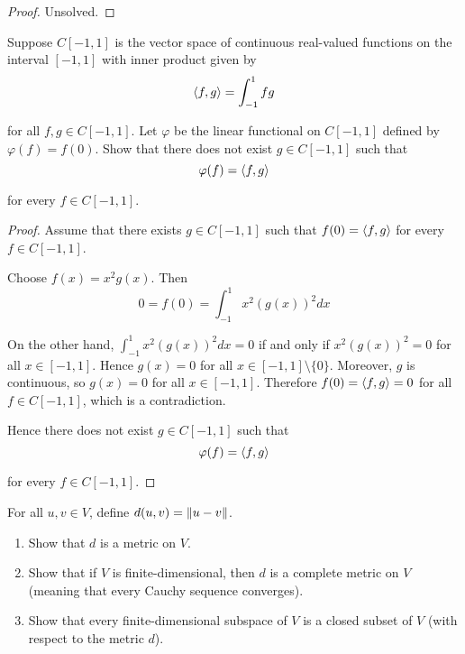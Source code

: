 \begin{proof}
    Unsolved.
\end{proof}
\newpage

\begin{exercise}
    Suppose $C[-1, 1]$ is the vector space of continuous real-valued functions
    on the interval $[-1, 1]$ with inner product given by
    \[
        \left\langle{f, g}\right\rangle = \int^{1}_{-1} fg
    \]

    for all $f, g\in C[-1, 1]$. Let $\varphi$ be the linear functional on $C[-1, 1]$ defined by $\varphi(f) = f(0)$. Show that there does not exist $g\in C[-1, 1]$ such that
    \[
        \varphi(f) = \left\langle{f, g}\right\rangle
    \]

    for every $f\in C[-1, 1]$.
\end{exercise}

\begin{proof}
    Assume that there exists $g\in C[-1, 1]$ such that $f(0) = \left\langle{f, g}\right\rangle$ for every $f\in C[-1, 1]$.

    Choose $f(x) = x^{2}g(x)$. Then
    \[
        0 = f(0) = \int^{1}_{-1}x^{2}{(g(x))}^{2}dx
    \]

    On the other hand, $\int^{1}_{-1}x^{2}{(g(x))}^{2}dx = 0$ if and only if $x^{2}{(g(x))}^{2} = 0$ for all $x\in [-1, 1]$. Hence $g(x) = 0$ for all $x\in [-1,1]\setminus\{0\}$. Moreover, $g$ is continuous, so $g(x) = 0$ for all $x\in [-1,1]$. Therefore $f(0) = \left\langle{f, g}\right\rangle = 0$ for all $f\in C[-1, 1]$, which is a contradiction.

    Hence there does not exist $g\in C[-1, 1]$ such that
    \[
        \varphi(f) = \left\langle{f, g}\right\rangle
    \]

    for every $f\in C[-1, 1]$.
\end{proof}
\newpage

\begin{exercise}
    For all $u, v \in V$, define $d(u, v) = \left\Vert{u - v}\right\Vert$.
    \begin{enumerate}[label={(\alph*)}]
        \item Show that $d$ is a metric on $V$.
        \item Show that if $V$ is finite-dimensional, then $d$ is a complete metric on $V$ (meaning that every Cauchy sequence converges).
        \item Show that every finite-dimensional subspace of $V$ is a closed subset of $V$ (with respect to the metric $d$).
    \end{enumerate}
\end{exercise}


